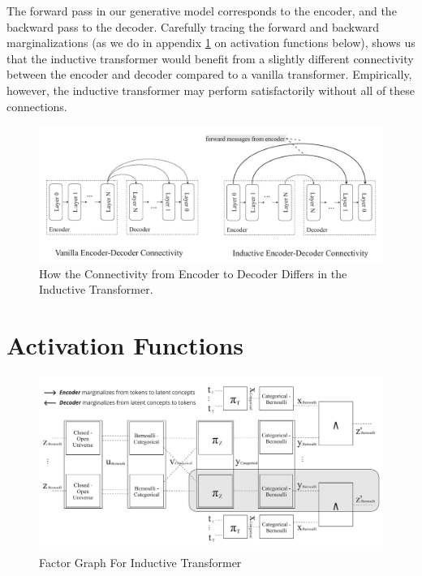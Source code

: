 \documentclass{article}
\begin{document}
The forward pass in our generative model corresponds to the encoder, and the backward pass to the decoder. Carefully tracing the forward and backward marginalizations (as we do in appendix \ref{appendix:activation-functions} on activation functions below), shows us that the inductive transformer would benefit from a slightly different connectivity between the encoder and decoder compared to a vanilla transformer.  Empirically, however, the inductive transformer may perform satisfactorily without all of these connections.

\begin{figure}[H]
\centering
\includegraphics[width=\textwidth]{figures/inductive-encoder-decoder-connectivity.pdf}
\caption{How the Connectivity from Encoder to Decoder Differs in the Inductive Transformer.}
\label{fig:logical-encoder-decoder}
\end{figure}


\section{Activation Functions}\label{appendix:activation-functions}

\begin{figure}[H]
    \centering
    \includegraphics[width=\textwidth]{figures/transformer_factor_graph.pdf}
    \caption{Factor Graph For Inductive Transformer}
    \label{fig-appendix:factor-graph-for-inductive-transformer}
\end{figure}
\end{document}
